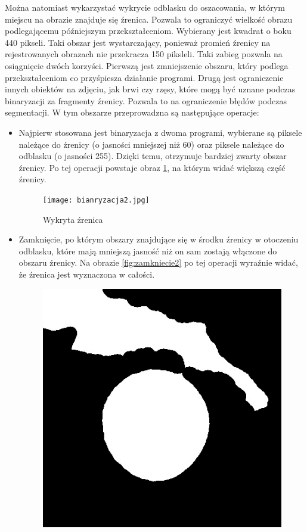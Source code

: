 Można natomiast wykarzystać wykrycie odblasku do oszacowania, w którym miejscu na obrazie znajduje się źrenica. Pozwala to ograniczyć wielkość obrazu podlegającemu późniejszym przekształceniom. Wybierany jest kwadrat o boku 440 pikseli. Taki obszar jest wystarczający, ponieważ promień źrenicy na rejestrowanych obrazach nie przekracza 150 piksleli. Taki zabieg pozwala na osiągnięcie dwóch korzyści. Pierwszą jest zmniejszenie obszaru, który podlega przekształceniom co przyśpiesza działanie programi. Drugą jest ograniczenie innych obiektów na zdjęciu, jak brwi czy rzęsy, które mogą być uznane podczas binaryzacji za fragmenty źrenicy. Pozwala to na ograniczenie błędów podczas segmentacji. W tym obszarze przeprowadzna są następujące operacje:
\begin{itemize}
\item Najpierw stosowana jest binaryzacja z dwoma programi, wybierane są piksele należące do źrenicy (o jasności mniejszej niż 60) oraz piksele należące do odblasku (o jasności 255). Dzięki temu, otrzymuje bardziej zwarty obszar źrenicy. Po tej operacji powstaje obraz \ref{fig:binaryzacja2}, na którym widać większą część źrenicy.
\begin{figure}
\begin{center}
\texttt{[image: bianryzacja2.jpg]}
\caption{Wykryta źrenica}
\label{fig:binaryzacja2}
\end{center}
\end{figure}
\item Zamknięcie, po którym obszary znajdujące się w środku źrenicy w otoczeniu odblasku, które mają mniejszą jasność niż on sam zostają włączone do obszaru źrenicy. Na obrazie \ref{fig:zamkniecie2} po tej operacji wyraźnie widać, że źrenica jest wyznaczona w całości.
\begin{figure}
\begin{center}
\includegraphics[scale=0.5]{zamkniecie.jpg}

\end{center}
\end{figure}
\end{itemize}
